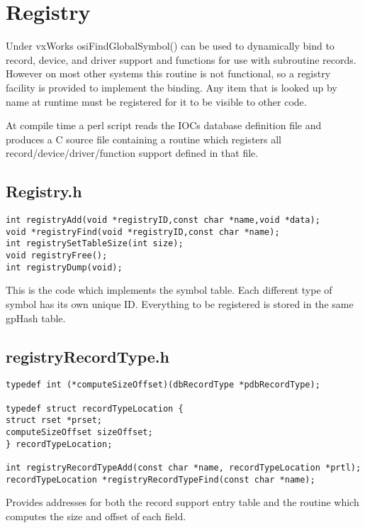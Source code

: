 





\chapter{Registry}

Under vxWorks osiFindGlobalSymbol() can be used to dynamically bind to record, device, and driver support and 
functions for use with subroutine records. However on most other systems this routine is not functional, so a registry 
facility is provided to implement the binding. Any item that is looked up by name at runtime must be registered for it to be 
visible to other code.

At compile time a perl script reads the IOCs database definition file and produces a C source file containing a routine 
which registers all record/device/driver/function support defined in that file.

\section{Registry.h}

\begin{verbatim}int registryAdd(void *registryID,const char *name,void *data);
void *registryFind(void *registryID,const char *name);
int registrySetTableSize(int size);
void registryFree();
int registryDump(void);
\end{verbatim}
This is the code which implements the symbol table. Each different type of symbol has its own unique ID. Everything to 
be registered is stored in the same gpHash table.

\section{registryRecordType.h}

\begin{verbatim}typedef int (*computeSizeOffset)(dbRecordType *pdbRecordType);

typedef struct recordTypeLocation {
struct rset *prset;
computeSizeOffset sizeOffset;
} recordTypeLocation;

int registryRecordTypeAdd(const char *name, recordTypeLocation *prtl);
recordTypeLocation *registryRecordTypeFind(const char *name);
\end{verbatim}
Provides addresses for both the record support entry table and the routine which computes the size and offset of each 
field.

